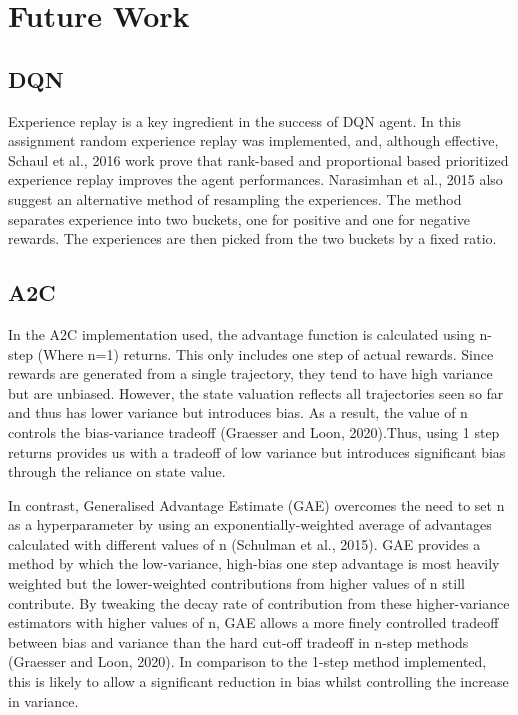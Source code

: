 \documentclass{article}
\begin{document}
\section{Future Work}

\subsection{DQN}
Experience replay is a key ingredient in the success of DQN agent. In this assignment random experience replay was implemented, and, although effective, Schaul et al., 2016 work prove that rank-based and proportional based prioritized experience replay improves the agent performances. Narasimhan et al., 2015 also suggest an alternative method of resampling the experiences. The method separates experience into two buckets, one for positive and one for negative rewards. The experiences are then picked from the two buckets by a fixed ratio.

\subsection{A2C}

In the A2C implementation used, the advantage function is calculated using n-step (Where n=1) returns. This only includes one step of actual rewards. Since rewards are generated from a single trajectory, they tend to have high variance but are unbiased. However, the state valuation reflects all trajectories seen so far and thus has lower variance but introduces bias. As a result, the value of n controls the bias-variance tradeoff (Graesser and Loon, 2020).Thus, using 1 step returns provides us with a tradeoff of low variance but introduces significant bias through the reliance on state value.

In contrast, Generalised Advantage Estimate (GAE) overcomes the need to set n as a hyperparameter by using an exponentially-weighted average of advantages calculated with different values of n (Schulman et al., 2015). GAE provides a method by which the low-variance, high-bias one step advantage is most heavily weighted but the lower-weighted contributions from higher values of n still contribute. By tweaking the decay rate of contribution from these higher-variance estimators with higher values of n, GAE allows a more finely controlled tradeoff between bias and variance than the hard cut-off tradeoff in n-step methods (Graesser and Loon, 2020). In comparison to the 1-step method implemented, this is likely to allow a significant reduction in bias whilst controlling the increase in variance.
\end{document}
